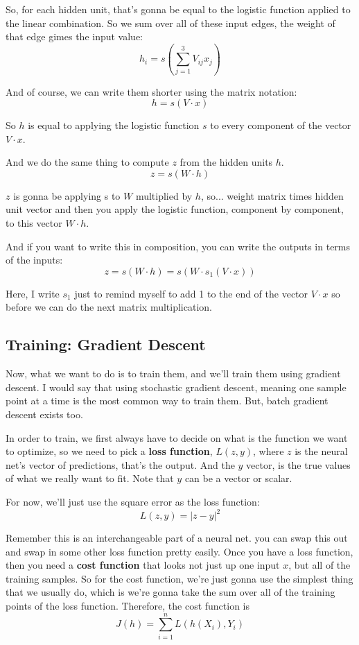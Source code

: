 \documentclass[fleqn,10pt]{olplainarticle}
\theoremstyle{definition}
\theoremstyle{remark}
\begin{document}
So, for each hidden unit, that's gonna be equal to the logistic function applied to the linear combination. So we sum over all of these input edges, the weight of that edge gimes the input value:
$$h_i = s(\sum_{j=1}^3 V_{ij}x_j)$$

And of course, we can write them shorter using the matrix notation:
$$h = s(V \cdot x)$$

So $h$ is equal to applying the logistic function $s$ to every component of the vector $V \cdot x$. 

And we do the same thing to compute $z$ from the hidden units $h$. 
$$z = s(W \cdot h)$$

$z$ is gonna be applying s to $W$ multiplied by $h$, so... weight matrix times hidden unit vector and then you apply the logistic function, component by component, to this vector $W \cdot h$.

And if you want to write this in composition, you can write the outputs in terms of the inputs:
$$z = s(W \cdot h) = s(W \cdot s_1(V\cdot x))$$

Here, I write $s_1$ just to remind myself to add 1 to the end of the vector ${V \cdot x}$ so before we can do the next matrix multiplication. 

\subsection*{Training: Gradient Descent}
Now, what we want to do is to train them, and we'll train them using gradient descent. I would say that using stochastic gradient descent, meaning one sample point at a time is the most common way to train them. But, batch gradient descent exists too. 

In order to train, we first always have to decide on what is the function we want to optimize, so we need to pick a \textbf{loss function}, $L(z, y)$, 
where $z$ is the neural net's vector of predictions, that's the output. And the $y$ vector, is the true values of what we really want to fit. Note that $y$ can be a vector or scalar. 

For now, we'll just use the square error as the loss function:
$$L(z, y)= |z-y|^2$$

Remember this is an interchangeable part of a neural net. you can swap this out and swap in some other loss function pretty easily. Once you have a loss function, then you need a \textbf{cost function} that looks not just up one input $x$, but all of the training samples. So for the cost function, we're just gonna use the simplest thing that we usually do, which is we're gonna take the sum over all of the training points of the loss function. Therefore, the cost function is
$$J(h) = \sum_{i=1}^n L(h(X_i), Y_i)$$
\end{document}
